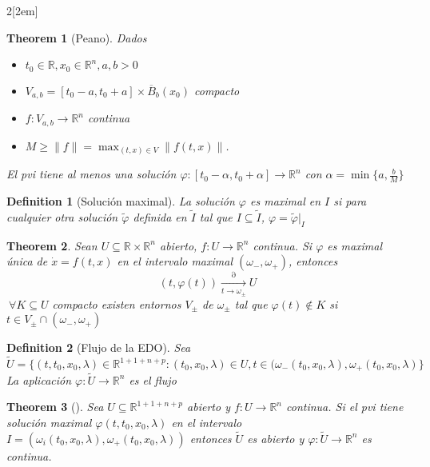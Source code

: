 \documentclass{myclass}
\newtheorem*{definition}{Definition}
\newtheorem*{theorem}{Theorem}
\begin{document}
\begin{multicols}{2}[\columnsep2em]
\begin{theorem}[Peano] Dados 
\begin{itemize}[topsep=-6pt, itemsep=0pt]
  \item $t_0\in \mathbb{R}, x_0 \in \mathbb{R}^n, a, b>0$
  \item $V_{a, b}=[t_0-a, t_0+a]\times \overline{B}_b(x_0)$ compacto
  \item $f:V_{a, b} \to  \mathbb{R}^n$ continua
  \item $M\ge \|f\|=\max_{(t,x)\in V}\|f(t,x)\|$.
\end{itemize}
El pvi tiene al menos una solución $\varphi : [t_0-\alpha , t_0+\alpha ] \to  \mathbb{R}^n$ con $\alpha = \min\{a, \frac{b}{M}\}$
\end{theorem}

\begin{definition}[Solución maximal] La solución $\varphi $ es maximal en $I$ si para cualquier otra solución $\tilde{\varphi }$ definida en $\tilde{I}$ tal que $I\subseteq \tilde{I}$, $\varphi = \tilde{\varphi }|_{I}$ 
\end{definition}

\begin{theorem} Sean $U\subseteq \mathbb{R}\times \mathbb{R}^n$ abierto, $f:U\to \mathbb{R}^n$ continua. Si $\varphi $ es maximal única de $\dot{x}=f(t,x)$ en el intervalo maximal $(\omega _-, \omega _+)$, entonces 
  \[
	(t,\varphi (t)) \xrightarrow[t \to \omega _{\pm}] \partial U
  \] 
  $\ \forall K\subseteq U$ compacto existen entornos $V_{\pm}$ de $\omega _{\pm}$ tal que $\varphi (t)\not\in K$ si $t\in V_{\pm}\cap (\omega _-,\omega _{+})$
\end{theorem}

\begin{definition}[Flujo de la EDO] Sea $\tilde{U} = \{(t, t_0, x_0, \lambda)\in \mathbb{R}^{1+1+n+p}: (t_0,x_0, \lambda)\in U, t\in (\omega_- (t_0, x_0, \lambda), \omega _+(t_0, x_0, \lambda)\}$
La aplicación $\varphi :\tilde{U}\to \mathbb{R}^n$ es el flujo
\end{definition}

\begin{theorem}[]
Sea $U \subseteq \mathbb{R}^{1+1+n+p}$ abierto y $f: U\to \mathbb{R}^n$ continua. Si el pvi tiene solución maximal $\varphi (t, t_0, x_0, \lambda)$ en el intervalo $I = (\omega _i(t_0,x_0,\lambda), \omega _+(t_0,x_0,\lambda))$ entonces $\tilde{U}$ es abierto y $\varphi :\tilde{U} \to  \mathbb{R}^n$ es continua.
\end{theorem}


\end{multicols}
\end{document}
